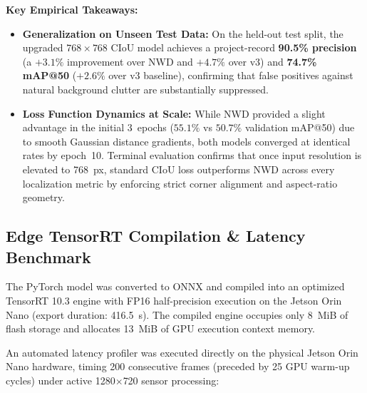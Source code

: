 \documentclass[11pt,a4paper]{article}
\begin{document}
\noindent
\textbf{Key Empirical Takeaways:}
\begin{itemize}[leftmargin=1.5em, itemsep=0.2em]
    \item \textbf{Generalization on Unseen Test Data:} On the held-out test split, the upgraded $768\times 768$ CIoU model achieves a project-record \textbf{90.5\% precision} (a $+3.1\%$ improvement over NWD and $+4.7\%$ over v3) and \textbf{74.7\% mAP@50} ($+2.6\%$ over v3 baseline), confirming that false positives against natural background clutter are substantially suppressed.
    \item \textbf{Loss Function Dynamics at Scale:} While NWD provided a slight advantage in the initial 3~epochs ($55.1\%$ vs $50.7\%$ validation mAP@50) due to smooth Gaussian distance gradients, both models converged at identical rates by epoch~10. Terminal evaluation confirms that once input resolution is elevated to 768~px, standard CIoU loss outperforms NWD across every localization metric by enforcing strict corner alignment and aspect-ratio geometry.
\end{itemize}

\subsection{Edge TensorRT Compilation \& Latency Benchmark}
The PyTorch model was converted to ONNX and compiled into an optimized TensorRT 10.3 engine with FP16 half-precision execution on the Jetson Orin Nano (export duration: 416.5~s). The compiled engine occupies only 8~MiB of flash storage and allocates 13~MiB of GPU execution context memory.

An automated latency profiler was executed directly on the physical Jetson Orin Nano hardware, timing 200 consecutive frames (preceded by 25 GPU warm-up cycles) under active 1280$\times$720 sensor processing:
\end{document}

